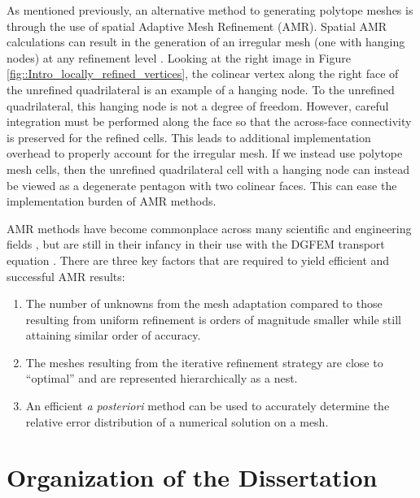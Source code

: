 As mentioned previously, an alternative method to generating polytope meshes is through the use of spatial Adaptive Mesh Refinement (AMR). Spatial AMR calculations can result in the generation of an irregular mesh (one with hanging nodes) at any refinement level \cite{carey1997computational,plewa2005adaptive}. Looking at the right image in Figure \ref{fig::Intro_locally_refined_vertices}, the colinear vertex along the right face of the unrefined quadrilateral is an example of a hanging node. To the unrefined quadrilateral, this hanging node is not a degree of freedom. However, careful integration must be performed along the face so that the across-face connectivity is preserved for the refined cells. This leads to additional implementation overhead to properly account for the irregular mesh. If we instead use polytope mesh cells, then the unrefined quadrilateral cell with a hanging node can instead be viewed as a degenerate pentagon with two colinear faces. This can ease the implementation burden of AMR methods.

AMR methods have become commonplace across many scientific and engineering fields \cite{plewa2005adaptive,carey1997computational,ramm2003error,karniadakis2013spectral,schwab1998p,solin2003higher}, but are still in their infancy in their use with the DGFEM transport equation \cite{fuhrer1997posteriori,hartmann2002adaptive,dedner2002adaptive,hartmann2003adaptive,ragusa2010two,wang2011standard}. There are three key factors that are required to yield efficient and successful AMR results:

\begin{enumerate}
\item The number of unknowns from the mesh adaptation compared to those resulting from uniform refinement is orders of magnitude smaller while still attaining similar order of accuracy.
\item The meshes resulting from the iterative refinement strategy are close to ``optimal'' and are represented hierarchically as a nest.
\item An efficient {\em a posteriori} method can be used to accurately determine the relative error distribution of a numerical solution on a mesh.
\end{enumerate}

\section{Organization of the Dissertation}
\label{sec::Intro_Organization}

